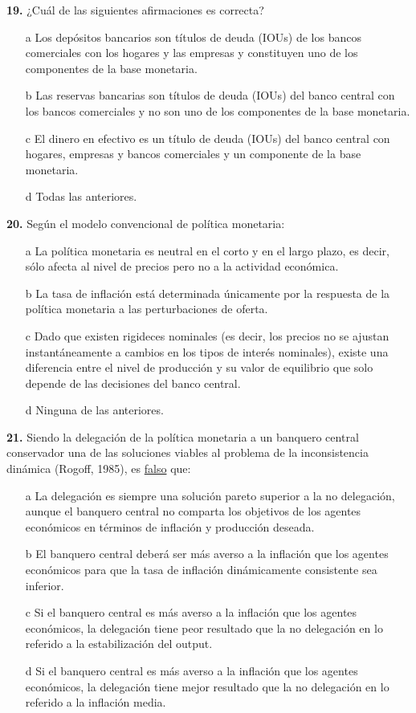 \documentclass{nuevotema}
\begin{document}
\textbf{19.} ¿Cuál de las siguientes afirmaciones es correcta?

\begin{itemize}
	\item[a] Los depósitos bancarios son títulos de deuda (IOUs) de los bancos comerciales con los hogares y las empresas y constituyen uno de los componentes de la base monetaria.
	\item[b] Las reservas bancarias son títulos de deuda (IOUs) del banco central con los bancos comerciales y no son uno de los componentes de la base monetaria.
	\item[c] El dinero en efectivo es un título de deuda (IOUs) del banco central con hogares, empresas y bancos comerciales y un componente de la base monetaria.
	\item[d] Todas las anteriores.
\end{itemize}

\textbf{20.} Según el modelo convencional de política monetaria:

\begin{itemize}
	\item[a] La política monetaria es neutral en el corto y en el largo plazo, es decir, sólo afecta al nivel de precios pero no a la actividad económica.
	\item[b] La tasa de inflación está determinada únicamente por la respuesta de la política monetaria a las perturbaciones de oferta.
	\item[c] Dado que existen rigideces nominales (es decir, los precios no se ajustan instantáneamente a cambios en los tipos de interés nominales), existe una diferencia entre el nivel de producción y su valor de equilibrio que solo depende de las decisiones del banco central.
	\item[d] Ninguna de las anteriores.
\end{itemize}


\textbf{21.} Siendo la delegación de la política monetaria a un banquero central conservador una de las soluciones viables al problema de la inconsistencia dinámica (Rogoff, 1985), es \underline{falso} que:

\begin{itemize}
	\item[a] La delegación es siempre una solución pareto superior a la no delegación, aunque el banquero central no comparta los objetivos de los agentes económicos en términos de inflación y producción deseada.
	\item[b] El banquero central deberá ser más averso a la inflación que los agentes económicos para que la tasa de inflación dinámicamente consistente sea inferior.
	\item[c] Si el banquero central es más averso a la inflación que los agentes económicos, la delegación tiene peor resultado que la no delegación en lo referido a la estabilización del output.
	\item[d] Si el banquero central es más averso a la inflación que los agentes económicos, la delegación tiene mejor resultado que la no delegación en lo referido a la inflación media.
\end{itemize}
\end{document}
